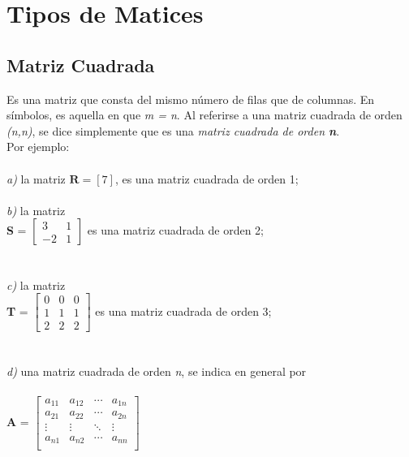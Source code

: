 \documentclass[a4paper,12pt]{report} %
\begin{document}
\chapter{Tipos de Matices}

\section{Matriz Cuadrada}
Es una matriz que consta del mismo número de filas que de columnas.
En símbolos, es aquella en que \textit{m = n}. Al referirse a una matriz cuadrada de orden \textit{(n,n)}, se dice simplemente que es una \textit{matriz cuadrada de orden \textbf{n}}.\\
Por ejemplo:
\\ \\
\textit{a)}  la matriz \(\mathbf{R} = \left[ 7 \right]\), es una matriz cuadrada de orden 1;\\ \\
\textit{b)}  la matriz\\ 

\textbf{S} =
$\begin{bmatrix}
3 & 1 \\
-2 & 1
\end{bmatrix}$
es una matriz cuadrada de orden 2;\\ \\
\\\textit{c)}  la matriz\\ 

\textbf{T} =
$\begin{bmatrix}
0 & 0 & 0 \\
1 & 1 & 1 \\
2 & 2 & 2
\end{bmatrix}$
es una matriz cuadrada de orden 3; \\ \\ 
\\\textit{d)}  una matriz cuadrada de orden \textit{n}, se indica en general por\\ \\
\textbf{A} =  
$\begin{bmatrix}
a_{11} & a_{12} & \cdots & a_{1n} \\
a_{21} & a_{22} & \cdots & a_{2n} \\
\vdots & \vdots & \ddots & \vdots \\
a_{n1} & a_{n2} & \cdots & a_{nn} \\
\end{bmatrix}$\\
\end{document}
